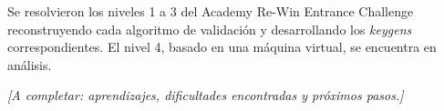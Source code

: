 Se resolvieron los niveles 1 a 3 del Academy Re-Win Entrance Challenge reconstruyendo cada algoritmo de validación y desarrollando los \emph{keygens} correspondientes. El nivel 4, basado en una máquina virtual, se encuentra en análisis.

\textit{[A completar: aprendizajes, dificultades encontradas y próximos pasos.]}
